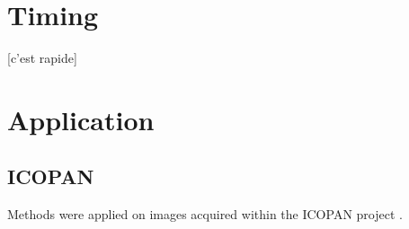 \documentclass{InsightArticle}
\begin{document}
\section{Timing}

[c'est rapide]

\section{Application}

\subsection{ICOPAN}

Methods were applied on images acquired within the ICOPAN project \cite{Andrey2010}.

\appendix





\nocite{ITKSoftwareGuide}
\end{document}
